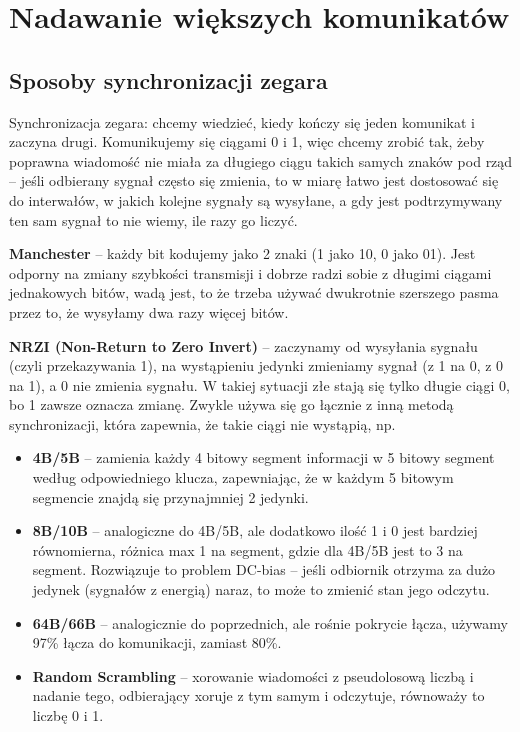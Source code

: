 \section{Nadawanie większych komunikatów}
\subsection{Sposoby synchronizacji zegara}
Synchronizacja zegara: chcemy wiedzieć, kiedy kończy się jeden komunikat i zaczyna drugi. Komunikujemy się ciągami 0 i 1, więc chcemy zrobić tak, żeby poprawna wiadomość nie miała za długiego ciągu takich samych znaków pod rząd -- jeśli odbierany sygnał często się zmienia, to w miarę łatwo jest dostosować się do interwałów, w jakich kolejne sygnały są wysyłane, a gdy jest podtrzymywany ten sam sygnał to nie wiemy, ile razy go liczyć.

\textbf{Manchester} -- każdy bit kodujemy jako 2 znaki (1 jako 10, 0 jako 01). Jest odporny na zmiany szybkości transmisji i dobrze radzi sobie z długimi ciągami jednakowych bitów, wadą jest, to że trzeba używać dwukrotnie szerszego pasma przez to, że wysyłamy dwa razy więcej bitów.

\textbf{NRZI (Non-Return to Zero Invert)} -- zaczynamy od wysyłania sygnału (czyli przekazywania 1), na wystąpieniu jedynki zmieniamy sygnał (z 1 na 0, z 0 na 1), a 0 nie zmienia sygnału. W takiej sytuacji złe stają się tylko długie ciągi 0, bo 1 zawsze oznacza zmianę. Zwykle używa się go łącznie z inną metodą synchronizacji, która zapewnia, że takie ciągi nie wystąpią, np.
\begin{itemize}
	\item \textbf{4B/5B} -- zamienia każdy 4 bitowy segment informacji w 5 bitowy segment według odpowiedniego klucza, zapewniając, że w każdym 5 bitowym segmencie znajdą się przynajmniej 2 jedynki.
	\item \textbf{8B/10B} -- analogiczne do 4B/5B, ale dodatkowo ilość 1 i 0 jest bardziej równomierna, różnica max 1 na segment, gdzie dla 4B/5B jest to 3 na segment. Rozwiązuje to problem DC-bias -- jeśli odbiornik otrzyma za dużo jedynek (sygnałów z energią) naraz, to może to zmienić stan jego odczytu.
	\item \textbf{64B/66B} -- analogicznie do poprzednich, ale rośnie pokrycie łącza, używamy 97\% łącza do komunikacji, zamiast 80\%.
	\item \textbf{Random Scrambling} -- xorowanie wiadomości z pseudolosową liczbą i nadanie tego, odbierający xoruje z tym samym i odczytuje, równoważy to liczbę 0 i 1.
\end{itemize}

